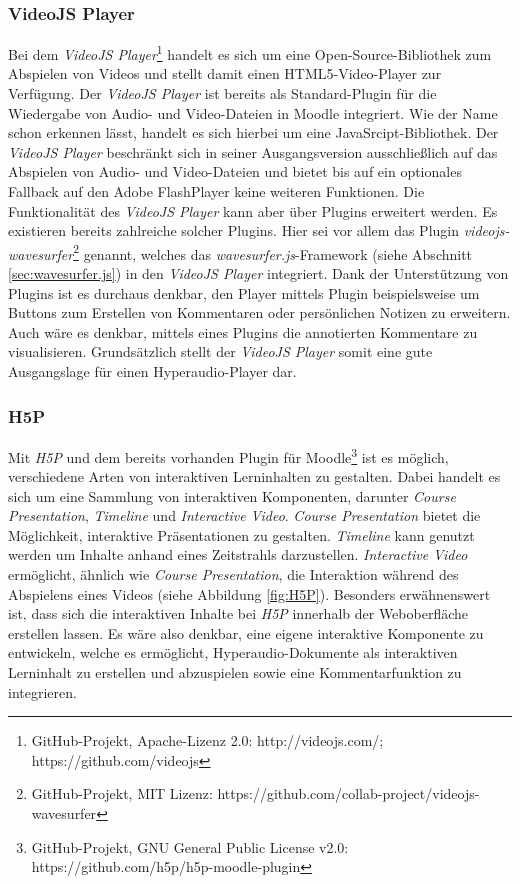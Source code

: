\subsubsection{VideoJS Player}
Bei dem \textit{VideoJS Player}\footnote{GitHub-Projekt, Apache-Lizenz 2.0: http://videojs.com/; https://github.com/videojs} handelt es sich um eine Open-Source-Bibliothek zum Abspielen von Videos und stellt damit einen HTML5-Video-Player zur Verfügung. Der \textit{VideoJS Player} ist bereits als Standard-Plugin für die Wiedergabe von Audio- und Video-Dateien in Moodle integriert. Wie der Name schon erkennen lässt, handelt es sich hierbei um eine JavaSrcipt-Bibliothek. Der \textit{VideoJS Player} beschränkt sich in seiner Ausgangsversion ausschließlich auf das Abspielen von Audio- und Video-Dateien und bietet bis auf ein optionales Fallback auf den Adobe FlashPlayer keine weiteren Funktionen. Die Funktionalität des \textit{VideoJS Player} kann aber über Plugins erweitert werden. Es existieren bereits zahlreiche solcher Plugins. Hier sei vor allem das Plugin \textit{videojs-wavesurfer}\footnote{GitHub-Projekt, MIT Lizenz: https://github.com/collab-project/videojs-wavesurfer} genannt, welches das \textit{wavesurfer.js}-Framework (siehe Abschnitt \ref{sec:wavesurfer.js}) in den \textit{VideoJS Player} integriert. Dank der Unterstützung von Plugins ist es durchaus denkbar, den Player mittels Plugin beispielsweise um Buttons zum Erstellen von Kommentaren oder persönlichen Notizen zu erweitern. Auch wäre es denkbar, mittels eines Plugins die annotierten Kommentare zu visualisieren. Grundsätzlich stellt der \textit{VideoJS Player} somit eine gute Ausgangslage für einen Hyperaudio-Player dar.

\subsubsection{H5P}
Mit \textit{H5P} und dem bereits vorhanden Plugin für Moodle\footnote{GitHub-Projekt, GNU General Public License v2.0: https://github.com/h5p/h5p-moodle-plugin} ist es möglich, verschiedene Arten von interaktiven Lerninhalten zu gestalten. Dabei handelt es sich um eine Sammlung von interaktiven Komponenten, darunter \textit{Course Presentation}, \textit{Timeline} und \textit{Interactive Video}. \textit{Course Presentation} bietet die Möglichkeit, interaktive Präsentationen zu gestalten. \textit{Timeline} kann genutzt werden um Inhalte anhand eines Zeitstrahls darzustellen. \textit{Interactive Video} ermöglicht, ähnlich wie \textit{Course Presentation}, die Interaktion während des Abspielens eines Videos (siehe Abbildung \ref{fig:H5P}). Besonders erwähnenswert ist, dass sich die interaktiven Inhalte bei \textit{H5P} innerhalb der Weboberfläche erstellen lassen. Es wäre also denkbar, eine eigene interaktive Komponente zu entwickeln, welche es ermöglicht, Hyperaudio-Dokumente als interaktiven Lerninhalt zu erstellen und abzuspielen sowie eine Kommentarfunktion zu integrieren.

